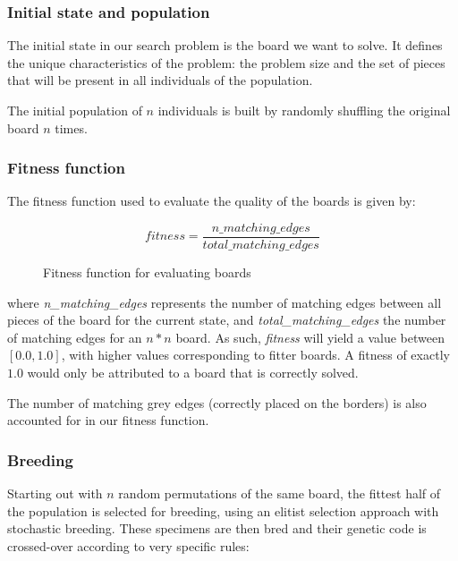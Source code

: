 \documentclass{llncs}
\begin{document}
\subsubsection{Initial state and population}

The initial state in our search problem is the board we want to solve. It defines the unique characteristics of the problem: the problem size and the set of pieces that will be present in all individuals of the population.

The initial population of $n$ individuals is built by randomly shuffling the original board $n$ times.

\subsubsection{Fitness function}\label{sec:fitness-function}

The fitness function used to evaluate the quality of the boards is given by:

\begin{figure}[H]
  \begin{equation}
    fitness = \frac{n\_matching\_edges}{total\_matching\_edges}
  \end{equation}
  \caption{Fitness function for evaluating boards}
  \label{fig:eq:fitness_function}
\end{figure}

where \textit{n\_matching\_edges} represents the number of matching edges between all pieces of the board for the current state, and \textit{total\_matching\_edges} the number of matching edges for an $n*n$ board. As such, \textit{fitness} will yield a value between $[0.0, 1.0]$, with higher values corresponding to fitter boards. A fitness of exactly $1.0$ would only be attributed to a board that is correctly solved.

The number of matching grey edges (correctly placed on the borders) is also accounted for in our fitness function.

\subsubsection{Breeding}

Starting out with $n$ random permutations of the same board, the fittest half of the population is selected for breeding, using an elitist selection approach with stochastic breeding. These specimens are then bred and their genetic code is crossed-over according to very specific rules:
\end{document}
